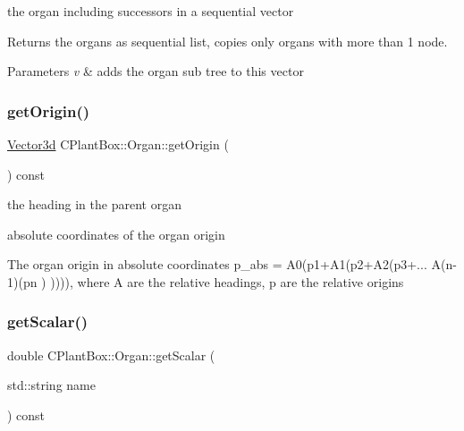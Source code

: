 the organ including successors in a sequential vector 

Returns the organs as sequential list, copies only organs with more than 1 node.


\begin{DoxyParams}{Parameters}
{\em v} & adds the organ sub tree to this vector \\
\hline
\end{DoxyParams}
\mbox{\label{classCPlantBox_1_1Organ_ac18526b4b44a40392a1f5db5ff2f6c72}} 
\subsubsection{\texorpdfstring{get\+Origin()}{getOrigin()}}
{\footnotesize\ttfamily \hyperlink{classCPlantBox_1_1Vector3d}{Vector3d} C\+Plant\+Box\+::\+Organ\+::get\+Origin (\begin{DoxyParamCaption}{ }\end{DoxyParamCaption}) const}



the heading in the parent organ 

absolute coordinates of the organ origin

The organ origin in absolute coordinates p\+\_\+abs = A0(p1+\+A1(p2+\+A2(p3+... A(n-\/1)(pn ) )))), where A are the relative headings, p are the relative origins \mbox{\label{classCPlantBox_1_1Organ_adf7d115c625341e0f6d291c750b05e5c}} 
\subsubsection{\texorpdfstring{get\+Scalar()}{getScalar()}}
{\footnotesize\ttfamily double C\+Plant\+Box\+::\+Organ\+::get\+Scalar (\begin{DoxyParamCaption}\item[{std\+::string}]{name }\end{DoxyParamCaption}) const\hspace{0.3cm}{\ttfamily [virtual]}}



